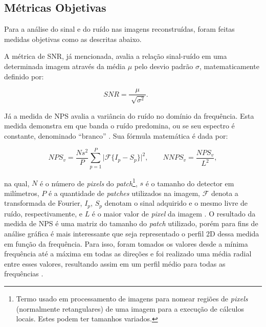 \subsection{Métricas Objetivas} 

Para a análise do sinal e do ruído nas imagens reconstruídas, foram feitas medidas objetivas como as descritas abaixo.


A métrica de \acs{SNR}, já mencionada, avalia a relação sinal-ruído em uma determinada imagem através da média $\mu$ pelo desvio padrão $\sigma$, matematicamente definido por: 

 \begin{equation}
 SNR = \dfrac{\mu}{\sqrt[]{\sigma^{2}}}.    	\qquad 
 \label{eq:eqSNR}
 \end{equation}
 
 Já a medida de \acs{NPS} avalia a variância do ruído no domínio da frequência. Esta medida demonstra em que banda o ruído predomina, ou se seu espectro é constante, denominado ``branco'' \cite{bertalmiodenoising2018}. Sua fórmula matemática é dada por:
 
 \begin{equation}
 NPS_{v} = \dfrac{Ns^{2}}{P} \sum_{p=1}^{P}  \vert \mathcal{F}\{I_{p}-S_{p}\}\vert^{2},    	\qquad 
 NNPS_{v} = \dfrac{NPS_{v}}{L^{2}},	 
 \label{eq:eqNNPS}
 \end{equation}

\noindent na qual, $N$ é o número de \textit{pixels} do \textit{patch}\footnote{ Termo usado em processamento de imagens para nomear regiões de \textit{pixels} (normalmente retangulares) de uma imagem para a execução de cálculos locais. Estes podem ter tamanhos variados.}, $s$ é o tamanho do detector em milímetros, $P$ é a quantidade de \textit{patches} utilizados na imagem, $\mathcal{F}$  denota a transformada de Fourier, $I_{p}$, $S_{p}$ denotam o sinal adquirido e o mesmo livre de ruído, respectivamente, e $L$ é o maior valor de \textit{pixel} da imagem \cite{dobbins2000handbook}. O resultado da medida de \acs{NPS} é uma matriz do tamanho do \textit{patch} utilizado, porém para fins de análise gráfica é mais interessante que seja representado o perfil \acs{2D} dessa medida em função da frequência. Para isso, foram tomados os valores desde a mínima frequência até a máxima em todas as direções e foi realizado uma média radial entre esses valores, resultando assim em um perfil médio para todas as frequências \cite{li2014statistical}.

